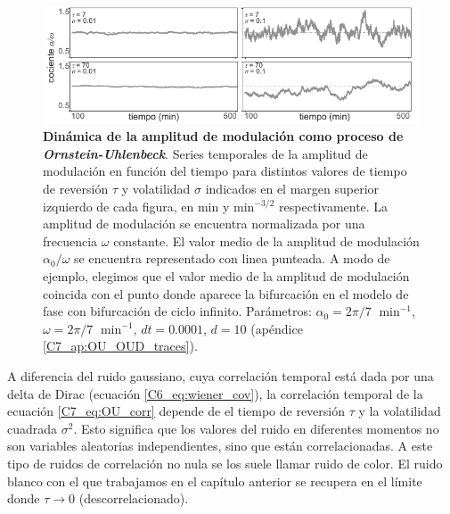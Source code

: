 \documentclass[./main.tex]{subfiles}
\begin{document}
\begin{figure}
    \centering
    \includegraphics[width=1\columnwidth]{figures/chapter7/C7_OU_alpha.pdf} 
    \caption{\textbf{Dinámica de la amplitud de modulación como proceso de \textit{Ornstein-Uhlenbeck}}. Series temporales de la amplitud de modulación en función del tiempo para distintos valores de tiempo de reversión $\tau$ y volatilidad $\sigma$ indicados en el margen superior izquierdo de cada figura, en min y $\text{min}^{-3/2}$ respectivamente. La amplitud de modulación se encuentra normalizada por una frecuencia $\omega$ constante. El valor medio de la amplitud de modulación $\alpha_0/\omega$ se encuentra representado con linea punteada. A modo de ejemplo, elegimos que el valor medio de la amplitud de modulación coincida con el punto donde aparece la bifurcación en el modelo de fase con bifurcación de ciclo infinito. Parámetros: $\alpha_0 = 2\pi/7 \;\text{ min}^{-1}$, $\omega = 2\pi/7 \;\text{ min}^{-1}$, $dt = 0.0001$, $d=10$ (apéndice \ref{C7_ap:OU_OUD_traces}).}
    \label{C7_fig:OU_alpha}
\end{figure} 

A diferencia del ruido gaussiano, cuya correlación temporal está dada por una delta de Dirac (ecuación \ref{C6_eq:wiener_cov}), la correlación temporal de la ecuación \ref{C7_eq:OU_corr} depende de el tiempo de reversión $\tau$ y la volatilidad cuadrada $\sigma^2$. Esto significa que los valores del ruido en diferentes momentos no son variables aleatorias independientes, sino que están correlacionadas. A este tipo de ruidos de correlación no nula se los suele llamar ruido de color. El ruido blanco con el que trabajamos en el capítulo anterior se recupera en el límite donde $\tau \rightarrow 0$ (descorrelacionado). 


\end{document}
